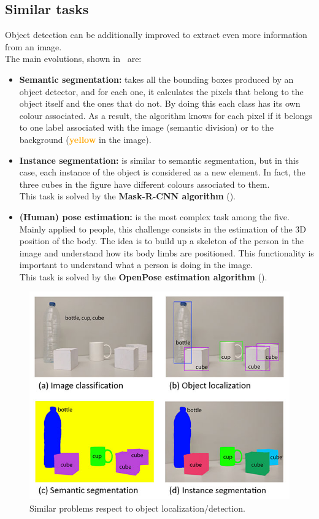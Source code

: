 \subsection{Similar tasks}
Object detection can be additionally improved to extract even more information from an image.\\
The main evolutions, shown in~ are:
\begin{itemize}
	\item \textbf{Semantic segmentation:} takes all the bounding boxes produced by an object detector, and for each one, it calculates the pixels that belong to the object itself and the ones that do not. By doing this each class has its own colour associated. As a result, the algorithm knows for each pixel if it belongs to one label associated with the image (semantic division) or to the background (\textbf{\textcolor{orange}{yellow}} in the image).
	\item \textbf{Instance segmentation:} is similar to semantic segmentation, but in this case, each instance of the object is considered as a new element. In fact, the three cubes in the figure have different colours associated to them.\\
	This task is solved by the \textbf{Mask-R-CNN algorithm} ().
	\item \textbf{(Human) pose estimation:} is the most complex task among the five. Mainly applied to people, this challenge consists in the estimation of the 3D position of the body. The idea is to build up a skeleton of the person in the image and understand how its body limbs are positioned. This functionality is important to understand what a person is doing in the image.\\
	This task is solved by the \textbf{OpenPose estimation algorithm} ().
\end{itemize}
\begin{figure}[!h]
	\centering
	\includegraphics[width=0.7\linewidth]{images/detection/types-of-img-analysis}
	\caption{Similar problems respect to object localization/detection.}
	\label{fig:imgAnalysisType}
\end{figure}



